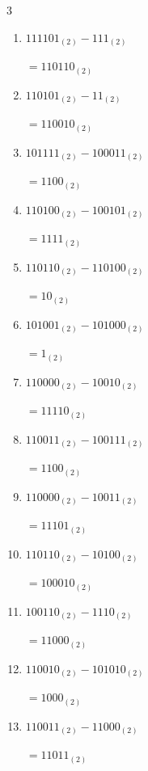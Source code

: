\newpage
\resetdrill

\begin{multicols}{3}
\begin{enumerate}
  \itemsep=30pt
  \item $111101_{(2)} - 111_{(2)}$

        $=110110_{(2)}$

  \item $110101_{(2)} - 11_{(2)}$

        $=110010_{(2)}$

  \item $101111_{(2)} - 100011_{(2)}$

        $=1100_{(2)}$

  \item $110100_{(2)} - 100101_{(2)}$

        $=1111_{(2)}$

  \item $110110_{(2)} - 110100_{(2)}$

        $=10_{(2)}$

  \item $101001_{(2)} - 101000_{(2)}$

        $=1_{(2)}$

  \item $110000_{(2)} - 10010_{(2)}$

        $=11110_{(2)}$

  \item $110011_{(2)} - 100111_{(2)}$

        $=1100_{(2)}$

  \item $110000_{(2)} - 10011_{(2)}$

        $=11101_{(2)}$

  \item $110110_{(2)} - 10100_{(2)}$

        $=100010_{(2)}$

\columnbreak %

  \item $100110_{(2)} - 1110_{(2)}$

        $=11000_{(2)}$

  \item $110010_{(2)} - 101010_{(2)}$

        $=1000_{(2)}$

  \item $110011_{(2)} - 11000_{(2)}$

        $=11011_{(2)}$


\end{enumerate}
\end{multicols}
